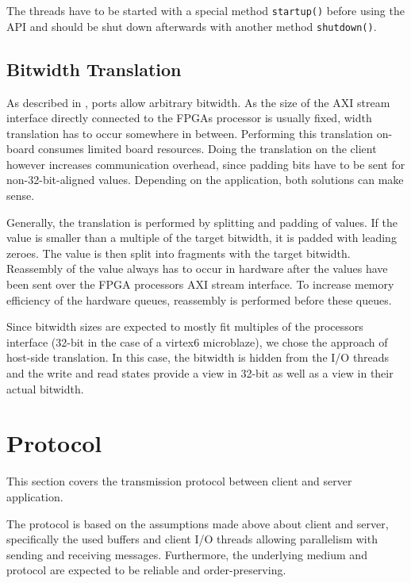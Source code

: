 \documentclass{report}
\begin{document}
The threads have to be started with a special method \texttt{startup()} before using the API and should be shut down afterwards with another method \texttt{shutdown()}.

\subsection{Bitwidth Translation}
\label{sec:arch:bitwidth}
As described in , ports allow arbitrary bitwidth. As the size of the AXI stream interface directly connected to the FPGAs processor is usually fixed, width translation has to occur somewhere in between. Performing this translation on-board consumes limited board resources. Doing the translation on the client however increases communication overhead, since padding bits have to be sent for non-32-bit-aligned values. Depending on the application, both solutions can make sense.

Generally, the translation is performed by splitting and padding of values. If the value is smaller than a multiple of the target bitwidth, it is padded with leading zeroes. The value is then split into fragments with the target bitwidth. Reassembly of the value always has to occur in hardware after the values have been sent over the FPGA processors AXI stream interface. To increase memory efficiency of the hardware queues, reassembly is performed before these queues. %

Since bitwidth sizes are expected to mostly fit multiples of the processors interface (32-bit in the case of a virtex6 microblaze), we chose the approach of host-side translation. In this case, the bitwidth is hidden from the I/O threads and the write and read states provide a view in 32-bit as well as a view in their actual bitwidth.

\section{Protocol}
\label{sec:protocol}
This section covers the transmission protocol between client and server application. 

The protocol is based on the assumptions made above about client and server, specifically the used buffers and client I/O threads allowing parallelism with sending and receiving messages. Furthermore, the underlying medium and protocol are expected to be reliable and order-preserving.
\end{document}
